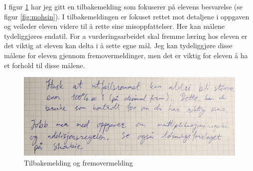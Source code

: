 \documentclass[main.tex]{subfiles}
\begin{document}
I figur \ref{fig:mohsin2} har jeg gitt en tilbakemelding som fokuserer på
elevens besvarelse (se figur \ref{fig:mohsin}). I tilbakemeldingen er fokuset
rettet mot detaljene i oppgaven og veileder eleven videre til å rette sine
misoppfattelser. Her kan målene tydeliggjøres endatil. For a vurderingsarbeidet
skal fremme læring hos eleven er det viktig at eleven kan delta i å sette egne
mål. Jeg kan tydeliggjøre disse målene for eleven gjennom fremovermeldinger,
men det er viktig for eleven å ha et forhold til disse målene.

\begin{figure}[h!]
\centering
\includegraphics[scale = 0.4]{../figures/mohsin2.png}
\caption{Tilbakemelding og fremovermelding}
\label{fig:mohsin2}
\end{figure}
\end{document}
